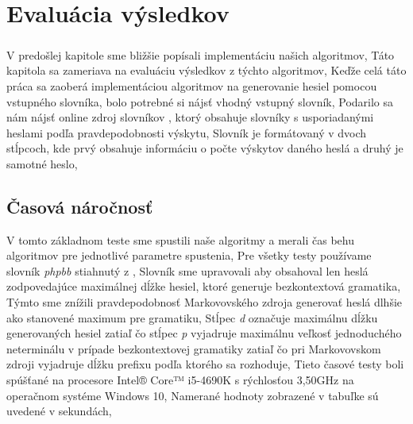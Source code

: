 \chapter{Evaluácia výsledkov}

\paragraph{}
V predošlej kapitole sme bližšie popísali implementáciu našich algoritmov, Táto kapitola sa zameriava na evaluáciu výsledkov z týchto algoritmov, Keďže celá táto práca sa zaoberá implementáciou algoritmov na generovanie hesiel pomocou vstupného slovníka, bolo potrebné si nájsť vhodný vstupný slovník, Podarilo sa nám nájsť online zdroj slovníkov \cite{dictionaries}, ktorý obsahuje slovníky s usporiadanými heslami podľa pravdepodobnosti výskytu, Slovník je formátovaný v dvoch stĺpcoch, kde prvý obsahuje informáciu o počte výskytov daného heslá a druhý je samotné heslo,

\section{Časová náročnosť}
\label{sec:time}
V tomto základnom teste sme spustili naše algoritmy a merali čas behu algoritmov pre jednotlivé parametre spustenia, Pre všetky testy používame slovník \emph{phpbb} stiahnutý z \cite{dictionaries}, Slovník sme upravovali aby obsahoval len heslá zodpovedajúce maximálnej dĺžke hesiel, ktoré generuje bezkontextová gramatika, Týmto sme znížili pravdepodobnosť Markovovského zdroja generovať heslá dlhšie ako stanovené maximum pre gramatiku, Stĺpec \emph{d} označuje maximálnu dĺžku generovaných hesiel zatiaľ čo stĺpec \emph{p} vyjadruje maximálnu veľkosť jednoduchého neterminálu v prípade bezkontextovej gramatiky zatiaľ čo pri Markovovskom zdroji vyjadruje dĺžku prefixu podľa ktorého sa rozhoduje, Tieto časové testy boli spúšťané na procesore Intel® Core™ i5-4690K s rýchlosťou 3,50GHz na operačnom systéme Windows 10, Namerané hodnoty zobrazené v tabuľke sú uvedené v sekundách,

